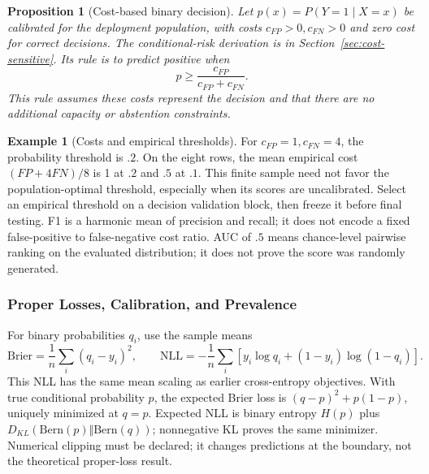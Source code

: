 \documentclass[11pt,twoside]{article}
\numberwithin{equation}{section}
\theoremstyle{plain}
\newtheorem{proposition}[theorem]{Proposition}
\theoremstyle{definition}
\newtheorem{example}[theorem]{Example}
\theoremstyle{remark}
\begin{document}
\begin{proposition}[Cost-based binary decision]
Let $p(x)=P(Y=1\mid X=x)$ be calibrated for the deployment population,
with costs $c_{FP}>0,c_{FN}>0$ and zero cost for correct decisions.
The conditional-risk derivation is in Section~\ref{sec:cost-sensitive}. Its rule is to predict positive when
\[
p\ge \frac{c_{FP}}{c_{FP}+c_{FN}}.
\]
This rule assumes these costs represent the decision and that there are no
additional capacity or abstention constraints.
\end{proposition}
\begin{example}[Costs and empirical thresholds]
For $c_{FP}=1,c_{FN}=4$, the probability threshold is $.2$. On the eight rows,
the mean empirical cost $(FP+4FN)/8$ is 1 at $.2$ and $.5$ at $.1$.
This finite sample need not favor the population-optimal threshold, especially
when its scores are uncalibrated. Select an empirical threshold on a decision
validation block, then freeze it before final testing. F1 is a harmonic mean
of precision and recall; it does not encode a fixed false-positive to
false-negative cost ratio. AUC of $.5$ means chance-level pairwise ranking on
the evaluated distribution; it does not prove the score was randomly generated.
\end{example}

\subsubsection{Proper Losses, Calibration, and Prevalence}
\label{sec:calibration-worked}
For binary probabilities $q_i$, use the sample means
\[
\mathrm{Brier}=\frac1n\sum_i(q_i-y_i)^2,\qquad
\mathrm{NLL}=-\frac1n\sum_i[y_i\log q_i+(1-y_i)\log(1-q_i)].
\]
This NLL has the same mean scaling as earlier cross-entropy objectives.
With true conditional probability $p$, the expected Brier loss is
$(q-p)^2+p(1-p)$, uniquely minimized at $q=p$. Expected NLL is binary
entropy $H(p)$ plus $D_{KL}(\mathrm{Bern}(p)\Vert\mathrm{Bern}(q))$;
nonnegative KL proves the same minimizer. Numerical clipping must be declared;
it changes predictions at the boundary, not the theoretical proper-loss result.
\end{document}
